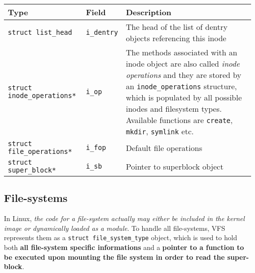 \documentclass[10pt,a4paper]{article}
\begin{document}
\begin{center}
\begin{tabular}{l|l|p{13cm}} 

\toprule
Type & Field & Description \\
\midrule
\texttt{struct list\_head} & \texttt{i\_dentry} & The head of the list of dentry objects referencing this inode 

\\
\texttt{struct inode\_operations*} & \texttt{i\_op} & The methods associated with an inode object are also called \textit{inode operations} and they are stored by an \texttt{inode\_operations} structure, which is populated by all possible inodes and filesystem types. Available functions are \texttt{create}, \texttt{mkdir}, \texttt{symlink} etc.



\\
\texttt{struct file\_operations*} & \texttt{i\_fop} & Default file operations 

\\
\texttt{struct super\_block*} & \texttt{i\_sb} & Pointer to superblock object 

\\
 
\bottomrule
\end{tabular}
\end{center}



\subsection{File-systems}

In Linux, \textit{the code for a file-system actually may either be included in the kernel image or dynamically loaded as a module}. To handle all file-systems, VFS represents them as a \texttt{struct file\_system\_type} object, which is used to hold both \textbf{all file-system specific informations} and a \textbf{pointer to a function to be executed upon mounting the file system in order to read the super-block}.
\end{document}
